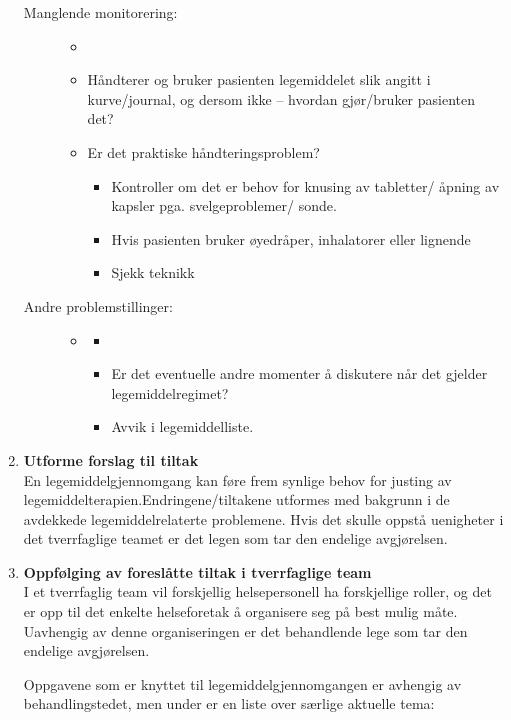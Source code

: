\begin{enumerate}
\begin{description}
\item[Manglende monitorering:]
\begin{itemize}
\item[]
\item Håndterer og bruker pasienten legemiddelet slik angitt i kurve/journal, og dersom ikke – hvordan gjør/bruker pasienten det? 
\item Er det praktiske håndteringsproblem? 
\small
\begin{itemize}
\item Kontroller om det er behov for knusing av tabletter/ åpning av kapsler pga. svelgeproblemer/ sonde.
\item Hvis pasienten bruker øyedråper, inhalatorer eller lignende 
\item Sjekk teknikk
\end{itemize}
\end{itemize}

\item[Andre problemstillinger:]
\begin{itemize}
\item[]
\begin{itemize}
\item[]
\item Er det eventuelle andre momenter å diskutere når det gjelder legemiddelregimet? 
\item Avvik i legemiddelliste.
\end{itemize}
\end{itemize}
\end{description}

\item \textbf{Utforme forslag til tiltak}\\
En legemiddelgjennomgang kan føre frem synlige behov for justing av legemiddelterapien.Endringene/tiltakene utformes med bakgrunn i de avdekkede legemiddelrelaterte problemene. Hvis det skulle oppstå uenigheter i det tverrfaglige teamet er det legen som tar den endelige avgjørelsen.

\item \textbf{Oppfølging av foreslåtte tiltak i tverrfaglige team
}\\
I et tverrfaglig team vil forskjellig helsepersonell ha forskjellige roller, og det er opp til det enkelte helseforetak å organisere seg på best mulig måte. Uavhengig av denne organiseringen er det behandlende lege som tar den endelige avgjørelsen. 

Oppgavene som er knyttet til legemiddelgjennomgangen er avhengig av behandlingstedet, men under er en liste over særlige aktuelle tema:


\end{enumerate}
